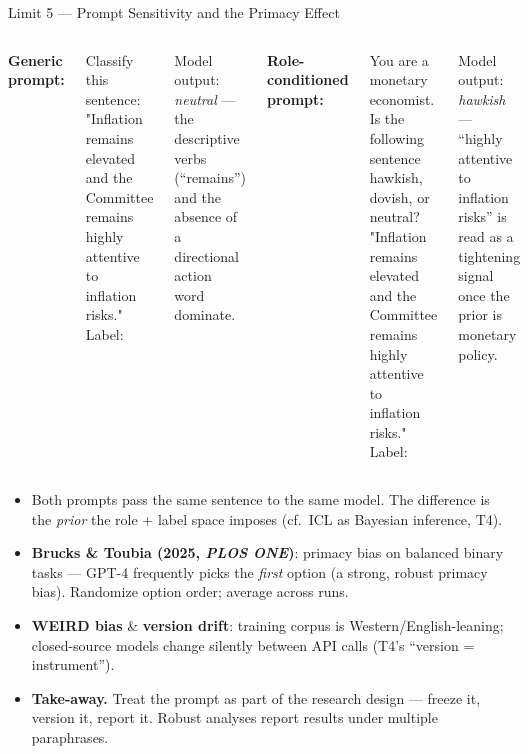 \begin{frame}{Limit 5 --- Prompt Sensitivity and the Primacy Effect}
\begin{columns}[T]
\textbf{Generic prompt:}
\begin{tcolorbox}[colback=blue!3, colframe=RedTitle!50, boxrule=0.3mm, arc=1mm, left=2mm, right=2mm, top=1mm, bottom=1mm]
\scriptsize\ttfamily
Classify this sentence:\\
"Inflation remains elevated and the Committee remains highly attentive to inflation risks."\\
Label:
\end{tcolorbox}
\smallskip
{\footnotesize Model output: \textit{neutral} --- the descriptive verbs (``remains'') and the absence of a directional action word dominate.}

\textbf{Role-conditioned prompt:}
\begin{tcolorbox}[colback=green!3, colframe=green!45!black, boxrule=0.3mm, arc=1mm, left=2mm, right=2mm, top=1mm, bottom=1mm]
\scriptsize\ttfamily
You are a monetary economist. Is the following sentence hawkish, dovish, or neutral?\\
"Inflation remains elevated and the Committee remains highly attentive to inflation risks."\\
Label:
\end{tcolorbox}
\smallskip
{\footnotesize Model output: \textit{hawkish} --- ``highly attentive to inflation risks'' is read as a tightening signal once the prior is monetary policy.}
\end{columns}

\medskip
\footnotesize
\begin{itemize}\itemsep1pt
\item Both prompts pass the same sentence to the same model. The difference is the \emph{prior} the role + label space imposes (cf.\ ICL as Bayesian inference, T4).
\item \textbf{Brucks \& Toubia (2025, \emph{PLOS ONE})}: primacy bias on balanced binary tasks --- GPT-4 frequently picks the \emph{first} option (a strong, robust primacy bias). Randomize option order; average across runs.
\item \textbf{WEIRD bias} \& \textbf{version drift}: training corpus is Western/English-leaning; closed-source models change silently between API calls (T4's ``version = instrument'').
\item \textbf{Take-away.} Treat the prompt as part of the research design --- freeze it, version it, report it. Robust analyses report results under multiple paraphrases.
\end{itemize}
\end{frame}

